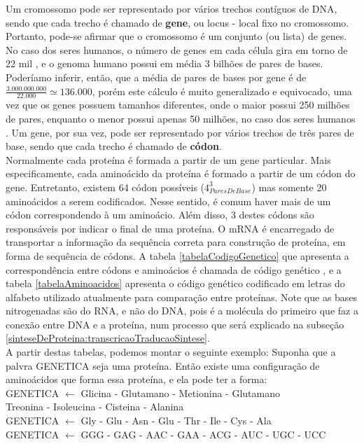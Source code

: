\indent Um cromossomo pode ser representado por vários trechos contíguos de DNA, sendo que cada trecho é chamado de \textbf{gene}, ou locus - local fixo no cromossomo. Portanto, pode-se afirmar que o cromossomo é um conjunto (ou lista) de genes. No caso dos seres humanos, o número de genes em cada célula gira em torno de 22 mil \cite{pertea2010}, e o genoma humano possui em média 3 bilhões de pares de bases. Poderíamo inferir, então, que a média de pares de bases por gene é de $\frac{3.000.000.000}{22.000} \simeq 136.000$, porém este cálculo é muito generalizado e equivocado, uma vez que os genes possuem tamanhos diferentes, onde o maior possui 250 milhões de pares, enquanto o menor possui apenas 50 milhões, no caso dos seres humanos \cite{nussbaum08}. Um gene, por sua vez, pode ser representado por vários trechos de três pares de base, sendo que cada trecho é chamado de \textbf{códon}. \\

\indent Normalmente cada proteína é formada a partir de um gene particular. Mais especificamente, cada aminoácido da proteína é formado a partir de um códon do gene. Entretanto, existem 64 códon possíveis ($4_{ParesDeBase} ^3$) mas somente 20 aminoácidos a serem codificados. Nesse sentido, é comum haver mais de um códon correspondendo à um aminoácio. Além disso, 3 destes códons são responsáveis por indicar o final de uma proteína. O mRNA é encarregado de transportar a informação da sequência correta para construção de proteína, em forma de sequência de códons. A tabela \ref{tabelaCodigoGenetico} que apresenta a correspondência entre códons e aminoácios é chamada de código genético \cite{setubal97}, e a tabela \ref{tabelaAminoacidos} apresenta o código genético codificado em letras do alfabeto utilizado atualmente para comparação entre proteínas. Note que as bases nitrogenadas são do RNA, e não do DNA, pois é a molécula do primeiro que faz a conexão entre DNA e a proteína, num processo que será explicado na subseção \ref{sinteseDeProteina:transcricaoTraducaoSintese}. \\

\indent A partir destas tabelas, podemos montar o seguinte exemplo: Suponha que a palvra GENETICA seja uma proteína. Então existe uma configuração de aminoácidos que forma essa proteína, e ela pode ter a forma: \\ 
\indent GENETICA $\leftarrow$ Glicina - Glutamano - Metionina - Glutamano \\
\hspace*{3.4cm}  Treonina - Isoleucina - Cisteina - Alanina \\
\indent GENETICA $\leftarrow$ Gly - Glu - Asn - Glu - Thr - Ile - Cys - Ala \\
\indent GENETICA $\leftarrow$ GGG - GAG - AAC - GAA - ACG - AUC - UGC - UCC \\


